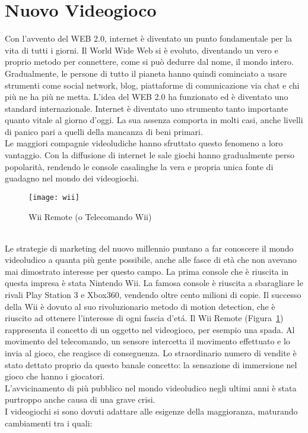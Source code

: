 \section{Nuovo Videogioco}
Con l’avvento del WEB 2.0, internet è diventato un punto fondamentale per la vita di tutti i giorni. Il World Wide Web si è evoluto, diventando un vero e proprio metodo per connettere, come si può dedurre dal nome, il mondo intero. Gradualmente, le persone di tutto il pianeta hanno quindi cominciato a usare strumenti come social network, blog, piattaforme di comunicazione via chat e chi più ne ha più ne metta. L’idea del WEB 2.0 ha funzionato ed è diventato uno standard internazionale. Internet è diventato uno strumento tanto importante quanto vitale al giorno d’oggi. La sua assenza comporta in molti casi, anche livelli di panico pari a quelli della mancanza di beni primari.\\Le maggiori compagnie videoludiche hanno sfruttato questo fenomeno a loro vantaggio. Con la diffusione di internet le sale giochi hanno gradualmente perso popolarità, rendendo le console casalinghe la vera e propria unica fonte di guadagno nel mondo dei videogiochi.\\
\begin{figure}[!ht]
\texttt{[image: wii]}
\centering
\caption{Wii Remote (o Telecomando Wii)}
\label{fig:wii}
\end{figure}
\\Le strategie di marketing  del nuovo millennio puntano a far conoscere il mondo videoludico a quanta più gente possibile, anche alle fasce di età che non avevano mai dimostrato interesse per questo campo. La prima console che è riuscita in questa impresa è stata Nintendo Wii. La famosa console è riuscita a sbaragliare le rivali Play Station 3 e Xbox360, vendendo oltre cento milioni di copie. Il successo della Wii è dovuto al suo rivoluzionario metodo di motion detection, che è riuscito ad ottenere l’interesse di ogni fascia d’etá. Il Wii Remote (Figura~\ref{fig:wii}) rappresenta il concetto di un oggetto nel videogioco, per esempio una spada. Al movimento del telecomando, un sensore intercetta il movimento effettuato e lo invia al gioco, che reagisce di conseguenza. Lo straordinario numero di vendite è stato dettato proprio da questo banale concetto: la sensazione di immersione nel gioco che hanno i giocatori.\\L’avvicinamento di più pubblico nel mondo videoludico negli ultimi anni è stata purtroppo anche causa di una grave crisi.\\I videogiochi si sono dovuti adattare alle esigenze della maggioranza, maturando cambiamenti tra i quali:

